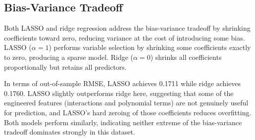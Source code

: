 \documentclass[12pt]{article}
\begin{document}
\subsection*{Bias-Variance Tradeoff}

Both LASSO and ridge regression address the bias-variance tradeoff by shrinking
coefficients toward zero, reducing variance at the cost of introducing some bias.
LASSO ($\alpha = 1$) performs variable selection by shrinking some coefficients
exactly to zero, producing a sparse model. Ridge ($\alpha = 0$) shrinks all
coefficients proportionally but retains all predictors.

In terms of out-of-sample RMSE, LASSO achieves 0.1711 while ridge achieves
0.1760. LASSO slightly outperforms ridge here, suggesting that some of the
engineered features (interactions and polynomial terms) are not genuinely
useful for prediction, and LASSO's hard zeroing of those coefficients reduces
overfitting. Both models perform similarly, indicating neither extreme of the
bias-variance tradeoff dominates strongly in this dataset.
\end{document}
